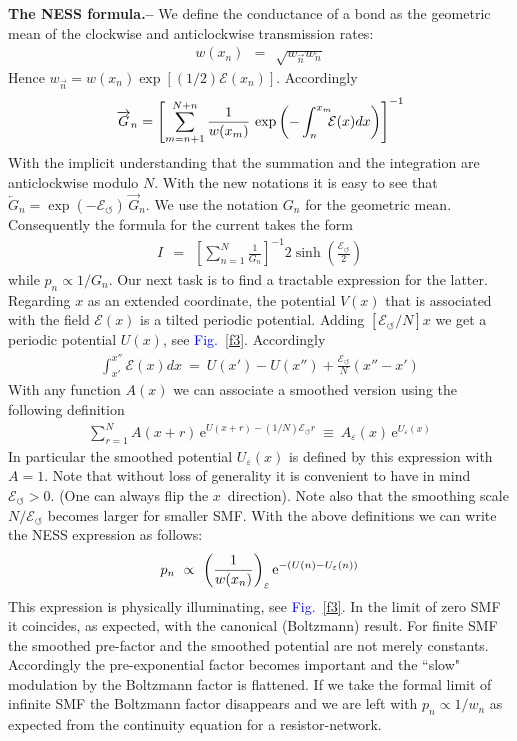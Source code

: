 \documentclass[aps,prl,floats,floatfix,twocolumn]{revtex4}
\newcommand{\eexp}{\mbox{e}^}
\newcommand{\mylabel}[1]{\label{#1}}
\newcommand{\beq}{\begin{eqnarray}}
\newcommand{\eeq}{\end{eqnarray}}
\newcommand{\be}[1]{\begin{eqnarray}\ifthenelse{#1=-1}
{\nonumber}{\ifthenelse{#1=0}{}{\mylabel{e#1}}}}
\newcommand{\sect}[1]{{\bf #1.-- }}
\newcommand{\Fig}[1]{\textcolor{blue}{Fig.}\!\!~\ref{#1}}
\begin{document}
\sect{The NESS formula}
%
%
We define the conductance of a bond as the geometric mean 
of the clockwise and anticlockwise transmission rates: 
%
\beq  
w(x_n) \ \ = \ \ \sqrt{ w_{\overrightarrow{n}} w_{\overleftarrow{n}} }
\eeq
%
Hence $w_{\overrightarrow{n}} = w(x_n) \exp[(1/2)\mathcal{E}(x_n)]$.
Accordingly 
%
%
\be{13}
\overrightarrow{G}_n = \left[ \sum_{m=n+1}^{N+n} \frac{1}{w(x_m)} 
\,\exp\left(-\int_{n}^{x_m} \!\!\!\mathcal{E}(x)dx \right) \right]^{-1} 
\eeq
%
With the implicit understanding that the summation and the integration 
are anticlockwise modulo $N$. With the new notations it is easy to see 
that ${\overleftarrow{G}_n = \exp(-\mathcal{E}_{\circlearrowleft}) \, \overrightarrow{G}_n}$.
We use the notation $G_n$ for the geometric mean. Consequently 
the formula for the current takes the form 
%
\beq
I \ \ = \ \ \left[\sum_{n=1}^N \frac{1}{G_n}\right]^{-1} 2\sinh\left(\frac{\mathcal{E}_{\circlearrowleft}}{2}\right)
\eeq 
%
while $p_n\propto 1/G_n$. Our next task is to find a tractable
expression for the latter. Regarding $x$ as an extended coordinate, 
the potential $V(x)$ that is associated with the field $\mathcal{E}(x)$ 
is a tilted periodic potential. Adding $[\mathcal{E}_{\circlearrowleft}/N] x$
we get a periodic potential $U(x)$, see \Fig{f3}. Accordingly 
%
\beq
\int_{x'}^{x''} \!\!\!\mathcal{E}(x)dx \ = \ U(x'){-}U(x'') + \frac{\mathcal{E}_{\circlearrowleft}}{N}(x''{-}x')
\eeq  
%
With any function $A(x)$ we can associate a smoothed version 
using the following definition  
%
\beq
\sum_{r=1}^N A(x{+}r) \, \eexp{U(x{+}r)- (1/N)\mathcal{E}_{\circlearrowleft}r} \ \equiv \ A_{\varepsilon}(x) \, \eexp{U_{\varepsilon}(x)} 
\eeq
%
In particular the smoothed potential $U_{\varepsilon}(x)$ is defined by this expression with ${A=1}$. 
Note that without loss of generality it is convenient to have 
in mind ${\mathcal{E}_{\circlearrowleft}>0}$. (One can always flip the $x$~direction).  
Note also that the smoothing scale $N/\mathcal{E}_{\circlearrowleft}$ becomes larger for smaller SMF.
With the above definitions we can write the NESS expression as follows:
%
\be{17}
p_n \ \propto \ \left( \frac{1}{w(x_n)} \right)_{\varepsilon} \eexp{-(U(n)-U_{\varepsilon}(n))}
\eeq
%
This expression is physically illuminating, see \Fig{f3}. 
In the limit of zero SMF it coincides, as expected, 
with the canonical (Boltzmann) result. 
For finite SMF the smoothed pre-factor and the smoothed potential
are not merely constants. Accordingly the pre-exponential factor
becomes important and the ``slow" modulation by the Boltzmann factor 
is flattened. If we take the formal limit of infinite SMF 
the Boltzmann factor disappears and we are left with ${p_n \propto 1/w_n}$    
as expected from the continuity equation for a resistor-network. 
\end{document}
